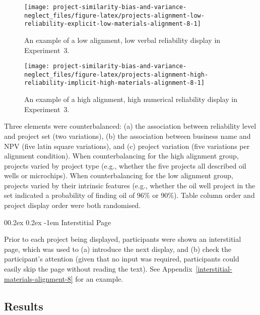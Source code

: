 \documentclass[
  english,
  man, donotrepeattitle,floatsintext]{apa7}
\makeatletter
\let\oldparagraph\paragraph
\renewcommand{\paragraph}[1]{\oldparagraph{#1}\mbox{}}
\renewcommand{\paragraph}{\@startsection{paragraph}{4}{\parindent}%
  {0\baselineskip \@plus 0.2ex \@minus 0.2ex}%
  {-1em}%
  {\normalfont\normalsize\bfseries\itshape\typesectitle}}
\theoremstyle{definition}
\theoremstyle{definition}
\theoremstyle{definition}
\theoremstyle{definition}
\theoremstyle{remark}
\makeatother
\begin{document}
\begin{figure}
\texttt{[image: project-similarity-bias-and-variance-neglect\_files/figure-latex/projects-alignment-low-reliability-explicit-low-materials-alignment-8-1]} \caption{An example of a low alignment, low verbal reliability display in Experiment~3.}\label{fig:projects-alignment-low-reliability-explicit-low-materials-alignment-8}
\end{figure}



\begin{figure}
\texttt{[image: project-similarity-bias-and-variance-neglect\_files/figure-latex/projects-alignment-high-reliability-implicit-high-materials-alignment-8-1]} \caption{An example of a high alignment, high numerical reliability display in Experiment~3.}\label{fig:projects-alignment-high-reliability-implicit-high-materials-alignment-8}
\end{figure}

Three elements were counterbalanced: (a) the association between reliability
level and project set (two variations), (b) the association between business
name and NPV (five latin square variations), and (c) project variation (five
variations per alignment condition). When counterbalancing for the high
alignment group, projects varied by project type (e.g., whether the five
projects all described oil wells or microchips). When counterbalancing for the
low alignment group, projects varied by their intrinsic features (e.g., whether
the oil well project in the set indicated a probability of finding oil of 96\% or
90\%). Table column order and project display order were both randomised.

\hypertarget{interstitial-page}{%
\paragraph{Interstitial Page}\label{interstitial-page}}

Prior to each project being displayed, participants were shown an interstitial
page, which was used to (a) introduce the next display, and (b) check the
participant's attention (given that no input was required, participants could
easily skip the page without reading the text). See
Appendix~\ref{interstitial-materials-alignment-8} for an example.

\hypertarget{results-1}{%
\subsection{Results}\label{results-1}}
\end{document}

